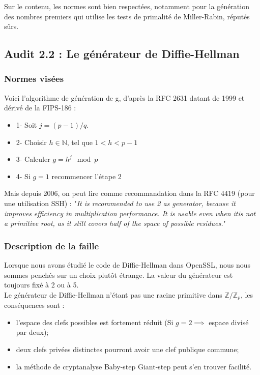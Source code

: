 			Sur le contenu, les normes sont bien respectées, notamment pour la génération des nombres premiers qui utilise les tests de primalité de Miller-Rabin, réputés sûrs.


	\subsection{Audit 2.2 : Le générateur de Diffie-Hellman}
		\subsubsection{\label{audit2.2}Normes visées}

		Voici l'algorithme de génération de g, d'après la RFC 2631 \cite{rfc2631} datant de 1999 et dérivé de la FIPS-186 : 
		\begin{itemize}
		\item 1- Soit $j = (p - 1)/q$.
		\item 2- Choisir $h \in \mathbb{N}$, tel que $1 < h < p - 1$
		\item 3- Calculer $g = h^j \mod p$
		\item 4- Si $g = 1$ recommencer l'étape 2\\
		\end{itemize}
	
		Mais depuis 2006, on peut lire comme recommandation dans la RFC 4419 (pour une utilisation SSH) : "\textit{It is recommended to use 2 as generator, because it improves	efficiency in multiplication performance.  It is usable even when itis not a primitive root, as it still covers half of the space of possible residues.}"\\
	
		\subsubsection{Description de la faille}
	
		Lorsque nous avons étudié le code de Diffie-Hellman dans OpenSSL, nous nous	sommes penchés sur un choix plutôt étrange. La valeur du générateur est toujours fixé à 2 ou à 5. \\
	
		Le générateur de Diffie-Hellman n'étant pas une racine primitive dans $\mathbb{Z}/\mathbb{Z}_p$, les conséquences sont :
		\begin{itemize}
		\item l'espace des clefs possibles est fortement réduit (Si $g=2 \implies$ espace divisé par deux);
		\item deux clefs privées distinctes pourront avoir une clef publique commune;
		\item la méthode de cryptanalyse Baby-step Giant-step peut s'en trouver facilité.\\
		\end{itemize}
	
